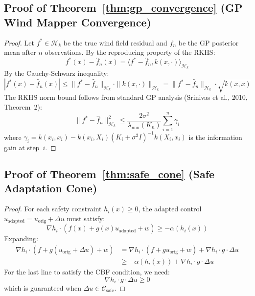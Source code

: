 \documentclass[11pt,twocolumn]{article}
\theoremstyle{definition}
\newcommand{\cH}{\mathcal{H}}
\newcommand{\cC}{\mathcal{C}}
\begin{document}
\subsection{Proof of Theorem~\ref{thm:gp_convergence} (GP Wind Mapper Convergence)}

\begin{proof}
Let $f^* \in \cH_k$ be the true wind field residual and $\hat{f}_n$ be the GP posterior mean after $n$ observations. By the reproducing property of the RKHS:
\begin{equation}
f^*(x) - \hat{f}_n(x) = \langle f^* - \hat{f}_n, k(x, \cdot) \rangle_{\cH_k}
\end{equation}
By the Cauchy-Schwarz inequality:
\begin{equation}
|f^*(x) - \hat{f}_n(x)| \leq \|f^* - \hat{f}_n\|_{\cH_k} \cdot \|k(x, \cdot)\|_{\cH_k} = \|f^* - \hat{f}_n\|_{\cH_k} \cdot \sqrt{k(x,x)}
\end{equation}
The RKHS norm bound follows from standard GP analysis (Srinivas et al., 2010, Theorem~2):
\begin{equation}
\|f^* - \hat{f}_n\|_{\cH_k}^2 \leq \frac{2\sigma^2}{\lambda_{\min}(K_n)} \sum_{i=1}^n \gamma_i
\end{equation}
where $\gamma_i = k(x_i, x_i) - k(x_i, X_i)(K_i + \sigma^2 I)^{-1}k(X_i, x_i)$ is the information gain at step~$i$.
\end{proof}

\subsection{Proof of Theorem~\ref{thm:safe_cone} (Safe Adaptation Cone)}

\begin{proof}
For each safety constraint $h_i(x) \geq 0$, the adapted control $u_{\text{adapted}} = u_{\text{orig}} + \Delta u$ must satisfy:
\begin{equation}
\nabla h_i \cdot (f(x) + g(x) u_{\text{adapted}} + w) \geq -\alpha(h_i(x))
\end{equation}
Expanding:
\begin{align}
\nabla h_i \cdot (f + g(u_{\text{orig}} + \Delta u) + w) &= \nabla h_i \cdot (f + g u_{\text{orig}} + w) + \nabla h_i \cdot g \cdot \Delta u \\
&\geq -\alpha(h_i(x)) + \nabla h_i \cdot g \cdot \Delta u
\end{align}
For the last line to satisfy the CBF condition, we need:
\begin{equation}
\nabla h_i \cdot g \cdot \Delta u \geq 0
\end{equation}
which is guaranteed when $\Delta u \in \cC_{\text{safe}}$.
\end{proof}
\end{document}
